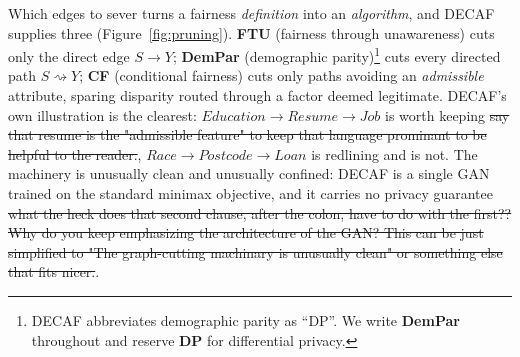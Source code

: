 \documentclass{article}
\begin{document}
Which edges to sever turns a fairness \emph{definition} into an \emph{algorithm},
and DECAF supplies three (Figure~\ref{fig:pruning}). \textbf{FTU} (fairness through
unawareness) cuts only the direct edge $S \rightarrow Y$; \textbf{DemPar}
(demographic parity)\footnote{DECAF abbreviates demographic parity as ``DP''. We
write \textbf{DemPar} throughout and reserve \textbf{DP} for differential privacy.} cuts every
directed path $S \rightsquigarrow Y$; \textbf{CF} (conditional fairness) cuts only
paths avoiding an \emph{admissible} attribute, sparing disparity routed through a
factor deemed legitimate. DECAF's own illustration is the clearest:
$\textit{Education} \rightarrow \textit{Resume} \rightarrow \textit{Job}$ is
worth keeping \st{say that resume is the "admissible feature" to keep that language prominant to be helpful to the reader.}, $\textit{Race} \rightarrow \textit{Postcode} \rightarrow
\textit{Loan}$ is redlining and is not. The machinery is unusually clean and
unusually confined: DECAF is a single GAN trained on the standard minimax
objective, and it carries no privacy guarantee \st{what the heck does that second clause, after the colon, have to do with the first?? Why do you keep emphasizing the architecture of the GAN? This can be just simplified to "The graph-cutting machinary is unusually clean" or something else that fits nicer.}.
\end{document}
